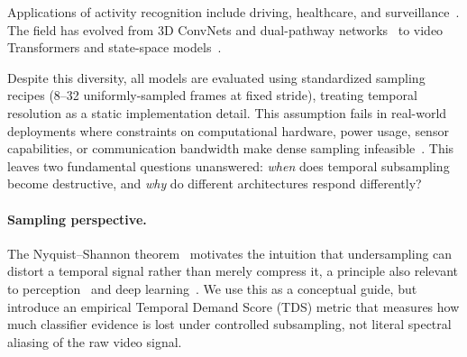 \documentclass[runningheads]{llncs}
\newcommand{\TDS}{\textsc{TDS}}
\begin{document}
Applications of activity recognition include driving, healthcare, and surveillance~\cite{5771372,10484402}. The field has evolved from 3D ConvNets and dual-pathway networks~\cite{tran2015c3d,carreira2017i3d,tran2018r2plus1d,wang2018nonlocal,feichtenhofer2019slowfast} to video Transformers and state-space models~\cite{bertasius2021timesformer,arnab2021vivit,liu2022videoswin,fan2021mvit,tong2022videomae,wang2023videomaev2,li2024videomamba}.

Despite this diversity, all models are evaluated using standardized sampling recipes (8--32 uniformly-sampled frames at fixed stride), treating temporal resolution as a static implementation detail. This assumption fails in real-world deployments where constraints on computational hardware, power usage, sensor capabilities, or communication bandwidth make dense sampling infeasible~\cite{lin2019tsm}. This leaves two fundamental questions unanswered: \emph{when} does temporal subsampling become destructive, and \emph{why} do different architectures respond differently?

\paragraph{Sampling perspective.}
The Nyquist--Shannon theorem~\cite{shannon1949communication} motivates the intuition that undersampling can distort a temporal signal rather than merely compress it, a principle also relevant to perception~\cite{vanrullen2007wagon} and deep learning~\cite{zhang2019antialiased}. We use this as a conceptual guide, but introduce an empirical Temporal Demand Score (\TDS{}) metric that measures how much classifier evidence is lost under controlled subsampling, not literal spectral aliasing of the raw video signal.
\end{document}
